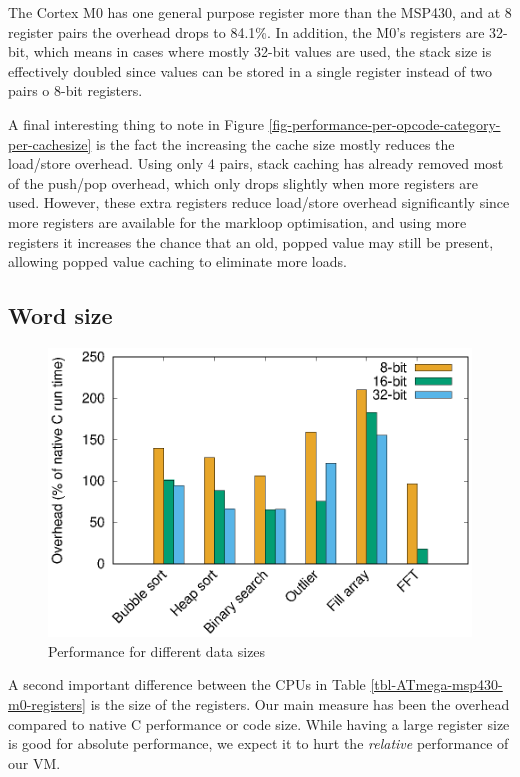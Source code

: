 The Cortex M0 has one general purpose register more than the MSP430, and at 8 register pairs the overhead drops to 84.1\%. In addition, the M0's registers are 32-bit, which means in cases where mostly 32-bit values are used, the stack size is effectively doubled since values can be stored in a single register instead of two pairs o 8-bit registers.

A final interesting thing to note in Figure \ref{fig-performance-per-opcode-category-per-cachesize} is the fact the increasing the cache size mostly reduces the load/store overhead. Using only 4 pairs, stack caching has already removed most of the push/pop overhead, which only drops slightly when more registers are used. However, these extra registers reduce load/store overhead significantly since more registers are available for the markloop optimisation, and using more registers it increases the chance that an old, popped value may still be present, allowing popped value caching to eliminate more loads.

\subsection{Word size}
\label{sec-evaluation-other-platforms-word-size}

\begin{figure}
\centering
\includegraphics[width=\mygraphsize]{8_16_32_bit.eps}
\caption{Performance for different data sizes}
\label{fig-performance-8-16-32-bit}
\end{figure}



A second important difference between the CPUs in Table \ref{tbl-ATmega-msp430-m0-registers} is the size of the registers. Our main measure has been the overhead compared to native C performance or code size. While having a large register size is good for absolute performance, we expect it to hurt the \emph{relative} performance of our VM.

